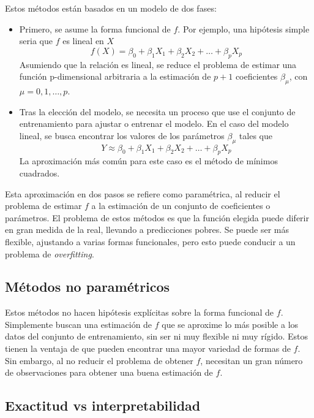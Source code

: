 \noindent Estos métodos están basados en un modelo de dos fases:
\begin{itemize}
\item Primero, se asume la forma funcional de $f$. Por ejemplo, una hipótesis simple seria que $f$ es lineal en $X$
\begin{equation}
f(X) = \beta_0 + \beta_1 X_1 + \beta_2 X_2 + \dots + \beta_p X_p 
\end{equation}
Asumiendo que la relación es lineal, se reduce el problema de estimar una función p-dimensional arbitraria a la estimación de $p + 1$ coeficientes $\beta_\mu$, con $\mu = 0, 1, \dots, p$. 
\item Tras la elección del modelo, se necesita un proceso que use el conjunto de entrenamiento para ajustar o entrenar el modelo. En el caso del modelo lineal, se busca encontrar los valores de los parámetros $\beta_\mu$ tales que 
\begin{equation}
Y \approx \beta_0 + \beta_1 X_1 + \beta_2 X_2 + \dots + \beta_p X_p
\end{equation}
La aproximación más común para este caso es el método de mínimos cuadrados.
\end{itemize}

Esta aproximación en dos pasos se refiere como paramétrica, al reducir el problema de estimar $f$ a la estimación de un conjunto de coeficientes o parámetros. El problema de estos métodos es que la función elegida puede diferir en gran medida de la real, llevando a predicciones pobres. Se puede ser más flexible, ajustando a varias formas funcionales, pero esto puede conducir a un problema de \textit{overfitting}. 

\subsection{Métodos no paramétricos}

Estos métodos no hacen hipótesis explícitas sobre la forma funcional de $f$. Simplemente buscan una estimación de $f$ que se aproxime lo más posible a los datos del conjunto de entrenamiento, sin ser ni muy flexible ni muy rígido. Estos tienen la ventaja de que pueden encontrar una mayor variedad de formas de $f$. Sin embargo, al no reducir el problema de obtener $f$, necesitan un gran número de observaciones para obtener una buena estimación de $f$. 

\subsection{Exactitud vs interpretabilidad}


